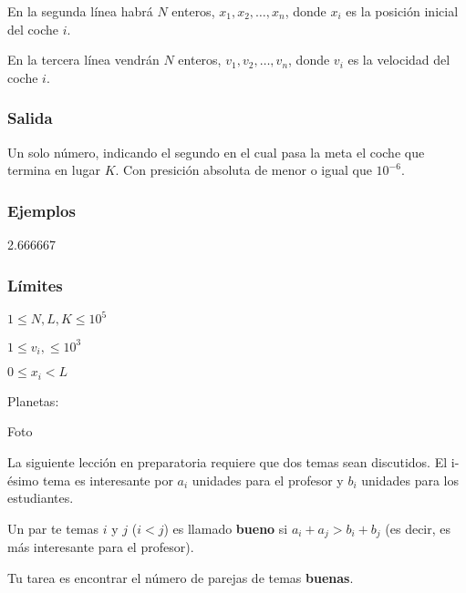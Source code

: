 En la segunda línea habrá \(N\) enteros, \(x_1, x_2, \ldots, x_n\), donde \(x_i\) es la posición inicial del coche \(i\).

En la tercera línea vendrán \(N\) enteros, \(v_1, v_2, \ldots, v_n\), donde \(v_i\) es la velocidad del coche \(i\).

\subsubsection*{Salida}
Un solo número, indicando el segundo en el cual pasa la meta el coche que termina en lugar \(K\). Con presición absoluta de menor o igual que \(10^{-6}\).

\subsubsection*{Ejemplos}
\begin{casebox2}
	  {
		2.666667
	}
\end{casebox2}
\subsubsection*{Límites}
\begin{plimits}
	\item \(1\leq N, L, K \leq 10^5\)
	\item \(1\leq v_i, \leq 10^3\)
	\item \(0 \leq x_i < L\)
\end{plimits}

\problembreak

\problemtitle Planetas: 


\problembreak

\problemtitle Foto


\problembreak

\problemtitle La siguiente lección en preparatoria requiere que dos temas sean discutidos. El i-ésimo tema es interesante por \(a_i\) unidades para el profesor y \(b_i\) unidades para los estudiantes.

Un par te temas \(i\) y \(j\) (\(i<j\)) es llamado \textbf{bueno} si \(a_i+a_j > b_i+b_j\) (es decir, es más interesante para el profesor).

Tu tarea es encontrar el número de parejas de temas \textbf{buenas}.
